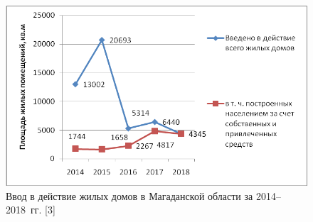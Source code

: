 \begin{figure}[h!]

  \begin{center}
    \includegraphics[width=1\textwidth]{authors/serebryakova-fig-3.png}
  \end{center}

  \caption{Ввод в действие жилых домов в Магаданской области
за 2014--2018~гг. [3]}
  \label{fig:serebryakova-fig-3}
\end{figure}
